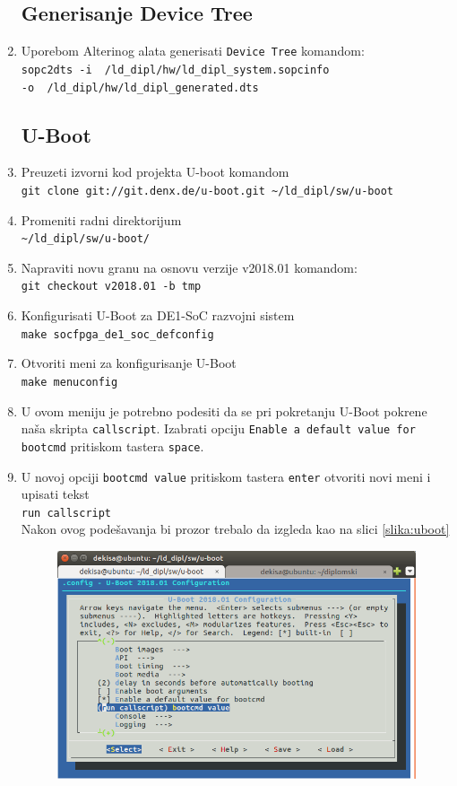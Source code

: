 \begin{enumerate}
\subsection{Generisanje Device Tree}
\item Uporebom Alterinog alata generisati \texttt{Device Tree} komandom: \\
\texttt{sopc2dts -i ~/ld\_dipl/hw/ld\_dipl\_system.sopcinfo \\-o ~/ld\_dipl/hw/ld\_dipl\_generated.dts}

\subsection{U-Boot}
\item Preuzeti izvorni kod projekta U-boot komandom\\ \texttt{git clone git://git.denx.de/u-boot.git \textasciitilde/ld\_dipl/sw/u-boot}
\item Promeniti radni direktorijum\\ \texttt{\textasciitilde/ld\_dipl/sw/u-boot/}
\item Napraviti novu granu na osnovu verzije v2018.01 komandom:\\ \texttt{git checkout v2018.01 -b tmp}
\item Konfigurisati U-Boot za DE1-SoC razvojni sistem\\ \texttt{make socfpga\_de1\_soc\_defconfig}
\item Otvoriti meni za konfigurisanje U-Boot\\ \texttt{make menuconfig}
\item U ovom meniju je potrebno podesiti da se pri pokretanju U-Boot pokrene naša skripta \texttt{callscript}. Izabrati opciju \texttt{Enable a default value for bootcmd} pritiskom tastera \texttt{space}.
\item U novoj opciji \texttt{bootcmd value} pritiskom tastera \texttt{enter} otvoriti novi meni i upisati tekst\\ \texttt{run callscript}\\
Nakon ovog podešavanja bi prozor trebalo da izgleda kao na slici \ref{slika:uboot}
\begin{figure}[h!]
\centering
\includegraphics[scale=0.6, trim={0 0 10 60},clip]{img/uboot.png}

\end{figure}
\end{enumerate}
